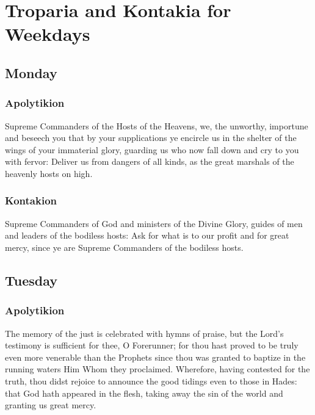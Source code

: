 \section{Troparia and Kontakia for Weekdays} \label{weekday}

\subsection{Monday}

\subsubsection{Apolytikion}

 Supreme Commanders of the Hosts of the Heavens, we, the unworthy, importune and beseech you that by your supplications ye encircle us in the shelter of the wings of your immaterial glory, guarding us who now fall down and cry to you with fervor: Deliver us from dangers of all kinds, as the great marshals of the heavenly hosts on high.

\subsubsection{Kontakion}

 Supreme Commanders of God and ministers of the Divine Glory, guides of men and leaders of the bodiless hosts: Ask for what is to our profit and for great mercy, since ye are Supreme Commanders of the bodiless hosts.

\subsection{Tuesday}

\subsubsection{Apolytikion}

 The memory of the just is celebrated with hymns of praise, but the Lord's testimony is sufficient for thee, O Forerunner; for thou hast proved to be truly even more venerable than the Prophets since thou was granted to baptize in the running waters Him Whom they proclaimed. Wherefore, having contested for the truth, thou didst rejoice to announce the good tidings even to those in Hades: that God hath appeared in the flesh, taking away the sin of the world and granting us great mercy. 

